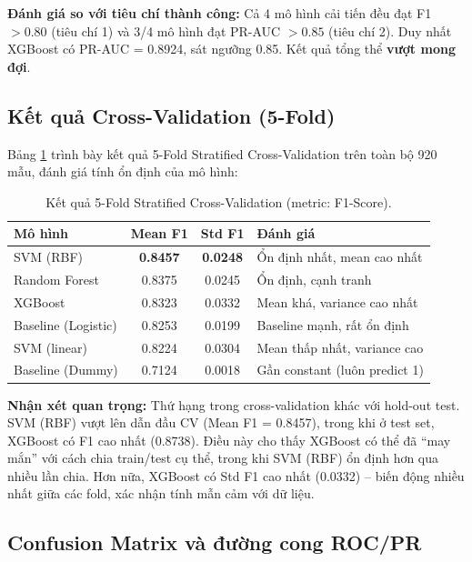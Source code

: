 \textbf{Đánh giá so với tiêu chí thành công:} Cả 4 mô hình cải tiến đều đạt F1 $> 0.80$ (tiêu chí 1) và 3/4 mô hình đạt PR-AUC $> 0.85$ (tiêu chí 2). Duy nhất XGBoost có PR-AUC = 0.8924, sát ngưỡng 0.85. Kết quả tổng thể \textbf{vượt mong đợi}.

\subsection{Kết quả Cross-Validation (5-Fold)}

Bảng \ref{tab:cv_results} trình bày kết quả 5-Fold Stratified Cross-Validation trên toàn bộ 920 mẫu, đánh giá tính ổn định của mô hình:

\begin{table}[H]
\centering
\caption{Kết quả 5-Fold Stratified Cross-Validation (metric: F1-Score).}
\label{tab:cv_results}
\begin{tabular}{|l|c|c|l|}
\hline
\textbf{Mô hình} & \textbf{Mean F1} & \textbf{Std F1} & \textbf{Đánh giá} \\ \hline
SVM (RBF) & \textbf{0.8457} & \textbf{0.0248} & Ổn định nhất, mean cao nhất \\ \hline
Random Forest & 0.8375 & 0.0245 & Ổn định, cạnh tranh \\ \hline
XGBoost & 0.8323 & 0.0332 & Mean khá, variance cao nhất \\ \hline
Baseline (Logistic) & 0.8253 & 0.0199 & Baseline mạnh, rất ổn định \\ \hline
SVM (linear) & 0.8224 & 0.0304 & Mean thấp nhất, variance cao \\ \hline
Baseline (Dummy) & 0.7124 & 0.0018 & Gần constant (luôn predict 1) \\ \hline
\end{tabular}
\end{table}

\textbf{Nhận xét quan trọng:} Thứ hạng trong cross-validation khác với hold-out test. SVM (RBF) vượt lên dẫn đầu CV (Mean F1 = 0.8457), trong khi ở test set, XGBoost có F1 cao nhất (0.8738). Điều này cho thấy XGBoost có thể đã ``may mắn'' với cách chia train/test cụ thể, trong khi SVM (RBF) ổn định hơn qua nhiều lần chia. Hơn nữa, XGBoost có Std F1 cao nhất (0.0332) -- biến động nhiều nhất giữa các fold, xác nhận tính mẫn cảm với dữ liệu.

\subsection{Confusion Matrix và đường cong ROC/PR}


